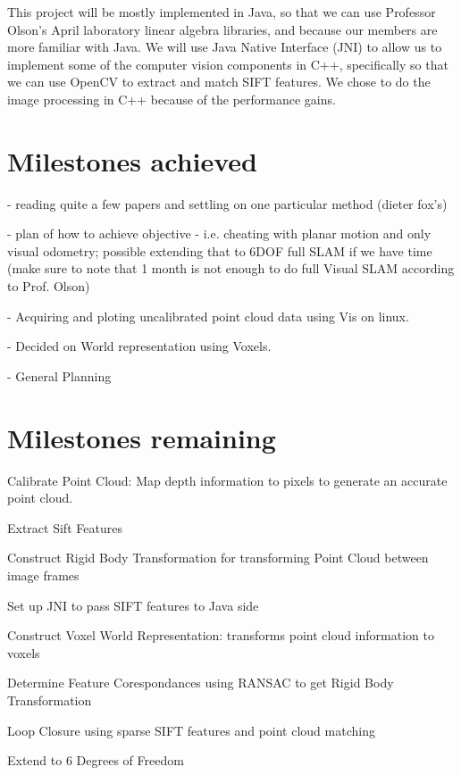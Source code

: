 \documentclass[12pt]{article}
\begin{document}
This project will be mostly implemented in Java, so that we can use Professor Olson's April laboratory linear algebra libraries, and because our members are more familiar with Java.  We will use Java Native Interface (JNI) to allow us to implement some of the computer vision components in C++, specifically so that we can use OpenCV to extract and match SIFT features. We chose to do the image processing in C++ because of the performance gains.

\section{Milestones achieved}
- reading quite a few papers and settling on one particular method (dieter fox's)

 - plan of how to achieve objective - i.e. cheating with planar motion and only visual odometry; possible extending that to 6DOF full SLAM if we have time (make sure to note that 1 month is not enough to do full Visual SLAM according to Prof. Olson)

- Acquiring and ploting uncalibrated point cloud data using Vis on linux.

- Decided on World representation using Voxels.

- General Planning

\section{Milestones remaining}
Calibrate Point Cloud: Map depth information to pixels to generate an accurate point cloud.

Extract Sift Features

Construct Rigid Body Transformation for transforming Point Cloud between image frames

Set up JNI to pass SIFT features to Java side

Construct Voxel World Representation: transforms point cloud information to voxels

Determine Feature Corespondances using RANSAC to get Rigid Body Transformation 

Loop Closure using sparse SIFT features and point cloud matching

Extend to 6 Degrees of Freedom
\end{document}
